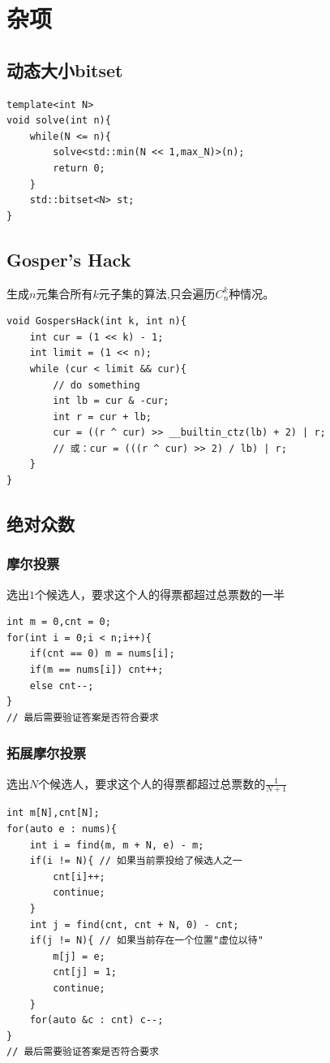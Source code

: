 \section{杂项}
\subsection{动态大小bitset}
\begin{lstlisting}[caption={}]
template<int N>
void solve(int n){
    while(N <= n){
        solve<std::min(N << 1,max_N)>(n);
        return 0;
    }
    std::bitset<N> st;
}
\end{lstlisting}

\subsection{Gosper's Hack}
生成$n$元集合所有$k$元子集的算法,只会遍历$C_n^k$种情况。
\begin{lstlisting}[caption={}]
void GospersHack(int k, int n){
    int cur = (1 << k) - 1;
    int limit = (1 << n);
    while (cur < limit && cur){
        // do something
        int lb = cur & -cur;
        int r = cur + lb;
        cur = ((r ^ cur) >> __builtin_ctz(lb) + 2) | r;
        // 或：cur = (((r ^ cur) >> 2) / lb) | r;
    }
}
\end{lstlisting}

\subsection{绝对众数}
\subsubsection{摩尔投票}
选出$1$个候选人，要求这个人的得票都超过总票数的一半 
\begin{lstlisting}[caption={}]
int m = 0,cnt = 0;
for(int i = 0;i < n;i++){
    if(cnt == 0) m = nums[i];
    if(m == nums[i]) cnt++;
    else cnt--;
}
// 最后需要验证答案是否符合要求
\end{lstlisting}

\subsubsection{拓展摩尔投票}
选出$N$个候选人，要求这个人的得票都超过总票数的$\frac{1}{N + 1}$
\begin{lstlisting}[caption={}]
int m[N],cnt[N];
for(auto e : nums){
    int i = find(m, m + N, e) - m;
    if(i != N){ // 如果当前票投给了候选人之一
        cnt[i]++;
        continue;
    }
    int j = find(cnt, cnt + N, 0) - cnt;
    if(j != N){ // 如果当前存在一个位置"虚位以待"
        m[j] = e;
        cnt[j] = 1;
        continue;
    }
    for(auto &c : cnt) c--;
}
// 最后需要验证答案是否符合要求
\end{lstlisting}

